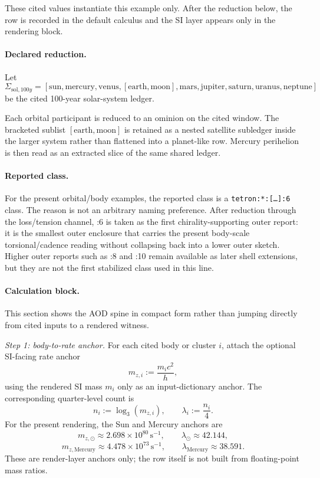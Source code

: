 These cited values instantiate this example only. After the reduction below, the row is recorded in the default calculus and the SI layer appears only in the rendering block.

\paragraph{Declared reduction.} Let
\[
\Sigma_{\mathrm{sol},100y} = [\mathrm{sun},\mathrm{mercury},\mathrm{venus},[\mathrm{earth},\mathrm{moon}],\mathrm{mars},\mathrm{jupiter},\mathrm{saturn},\mathrm{uranus},\mathrm{neptune}]
\]
be the cited 100-year solar-system ledger.

Each orbital participant is reduced to an ominion on the cited window. The bracketed sublist $[\mathrm{earth},\mathrm{moon}]$ is retained as a nested satellite subledger inside the larger system rather than flattened into a planet-like row. Mercury perihelion is then read as an extracted slice of the same shared ledger.

\paragraph{Reported class.} For the present orbital/body examples, the reported class is a \texttt{tetron:*:[\dots]:6} class. The reason is not an arbitrary naming preference. After reduction through the loss/tension channel, :6 is taken as the first chirality-supporting outer report: it is the smallest outer enclosure that carries the present body-scale torsional/cadence reading without collapsing back into a lower outer sketch. Higher outer reports such as :8 and :10 remain available as later shell extensions, but they are not the first stabilized class used in this line.

\paragraph{Calculation block.} This section shows the AOD spine in compact form rather than jumping directly from cited inputs to a rendered witness.

\textit{Step 1: body-to-rate anchor.} For each cited body or cluster $i$, attach the optional SI-facing rate anchor
\[
m_{z,i} := \frac{m_i c^2}{h},
\]
using the rendered SI mass $m_i$ only as an input-dictionary anchor. The corresponding quarter-level count is
\[
n_i := \log_3(m_{z,i}), \qquad \lambda_i := \frac{n_i}{4}.
\]
For the present rendering, the Sun and Mercury anchors are
\[
m_{z,\odot} \approx 2.698\times 10^{80}\,\mathrm{s}^{-1},\qquad \lambda_{\odot} \approx 42.144,
\]
\[
m_{z,\mathrm{Mercury}} \approx 4.478\times 10^{73}\,\mathrm{s}^{-1},\qquad \lambda_{\mathrm{Mercury}} \approx 38.591.
\]
These are render-layer anchors only; the row itself is not built from floating-point mass ratios.

